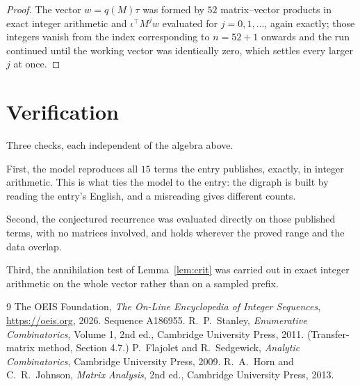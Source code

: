 \documentclass[11pt,a4paper]{article}
\theoremstyle{plain}
\theoremstyle{definition}
\begin{document}
\begin{proof}
The vector $w=q(M)\tau$ was formed by $52$ matrix--vector products in exact integer
arithmetic and $\iota^{\!\top}M^{j}w$ evaluated for $j=0,1,\dots$, again exactly; those
integers vanish from the index corresponding to $n=52+1$ onwards and the run continued
until the working vector was identically zero, which settles every larger $j$ at once.
\end{proof}

\section{Verification}

Three checks, each independent of the algebra above.

First, the model reproduces all $15$ terms the entry publishes, exactly, in integer
arithmetic. This is what ties the model to the entry: the digraph is built by reading the
entry's English, and a misreading gives different counts.

Second, the conjectured recurrence was evaluated directly on those published terms, with no
matrices involved, and holds wherever the proved range and the data overlap.

Third, the annihilation test of Lemma~\ref{lem:crit} was carried out in exact integer
arithmetic on the whole vector rather than on a sampled prefix.

\begin{thebibliography}{9}
 The OEIS Foundation, \emph{The On-Line Encyclopedia of Integer
Sequences}, \url{https://oeis.org}, 2026. Sequence A186955.
 R.~P.~Stanley, \emph{Enumerative Combinatorics}, Volume 1, 2nd ed.,
Cambridge University Press, 2011. (Transfer-matrix method, Section 4.7.)
 P.~Flajolet and R.~Sedgewick, \emph{Analytic Combinatorics}, Cambridge
University Press, 2009.
 R.~A.~Horn and C.~R.~Johnson, \emph{Matrix Analysis}, 2nd ed., Cambridge
University Press, 2013.
\end{thebibliography}
\end{document}
